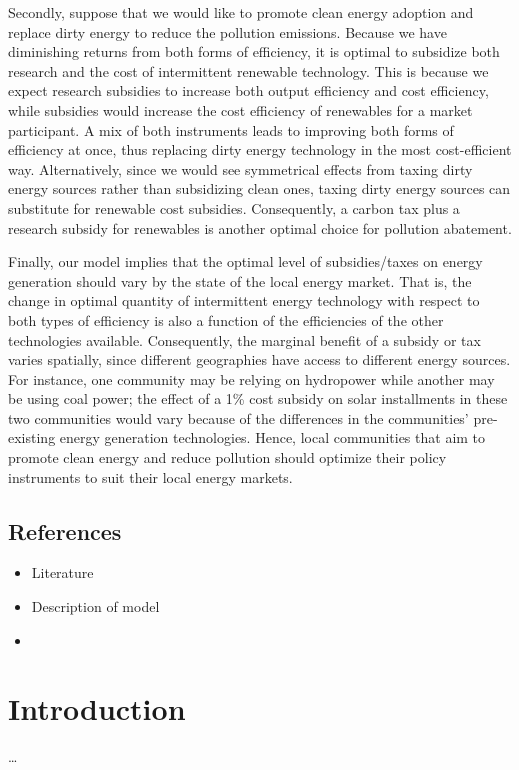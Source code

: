 \documentclass[12pt,a4paper]{extarticle}
\begin{document}
Secondly, suppose that we would like to promote clean energy adoption and replace dirty energy to reduce the pollution emissions. Because we have diminishing returns from both forms of efficiency, it is optimal to subsidize both research and the cost of intermittent renewable technology. This is because we expect research subsidies to increase both output efficiency and cost efficiency, while subsidies would increase the cost efficiency of renewables for a market participant. A mix of both instruments leads to improving both forms of efficiency at once, thus replacing dirty energy technology in the most cost-efficient way. Alternatively, since we would see symmetrical effects from taxing dirty energy sources rather than subsidizing clean ones, taxing dirty energy sources can substitute for renewable cost subsidies. Consequently, a carbon tax plus a research subsidy for renewables is another optimal choice for pollution abatement. 

Finally, our model implies that the optimal level of subsidies/taxes on energy generation should vary by the state of the local energy market. That is, the change in optimal quantity of intermittent energy technology with respect to both types of efficiency is also a function of the efficiencies of the other technologies available. Consequently, the marginal benefit of a subsidy or tax varies spatially, since different geographies have access to different energy sources. For instance, one community may be relying on hydropower while another may be using coal power; the effect of a 1\% cost subsidy on solar installments in these two communities would vary because of the differences in the communities’ pre-existing energy generation technologies. Hence, local communities that aim to promote clean energy and reduce pollution should optimize their policy instruments to suit their local energy markets. 

 
\subsection{References}

\begin{itemize}
	\item Literature
	\item Description of model
	\item 
\end{itemize}



\section{Introduction}
\dots
\end{document}
